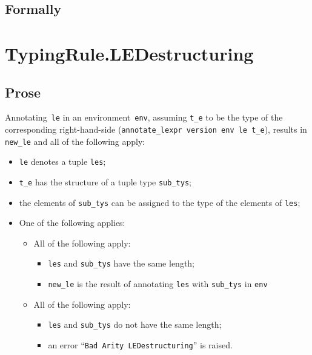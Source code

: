 \documentclass{book}
\begin{document}
\begin{emptyformal}
    \subsection{Formally}
\end{emptyformal}


\section{TypingRule.LEDestructuring \label{sec:TypingRule.LEDestructuring}}

  \subsection{Prose}
   Annotating~\texttt{le} in an environment~\texttt{env}, assuming
\texttt{t\_e} to be the type of the corresponding right-hand-side
(\texttt{annotate\_lexpr version env le t\_e}), results in \texttt{new\_le} and
all of the following apply:
   \begin{itemize}
   \item \texttt{le} denotes a tuple \texttt{les};
   \item \texttt{t\_e} has the structure of a tuple type \texttt{sub\_tys};
   \item the elements of \texttt{sub\_tys} can be assigned to the type of the elements of \texttt{les};
   \item One of the following applies:
     \begin{itemize}
     \item All of the following apply:
       \begin{itemize}
       \item \texttt{les} and \texttt{sub\_tys} have the same length;
       \item \texttt{new\_le} is the result of annotating \texttt{les} with \texttt{sub\_tys} in \texttt{env}
       \end{itemize}
     \item All of the following apply:
       \begin{itemize}
       \item \texttt{les} and \texttt{sub\_tys} do not have the same length;
       \item an error ``\texttt{Bad Arity LEDestructuring}'' is raised.
       \end{itemize}
     \end{itemize}
   \end{itemize}
\end{document}
